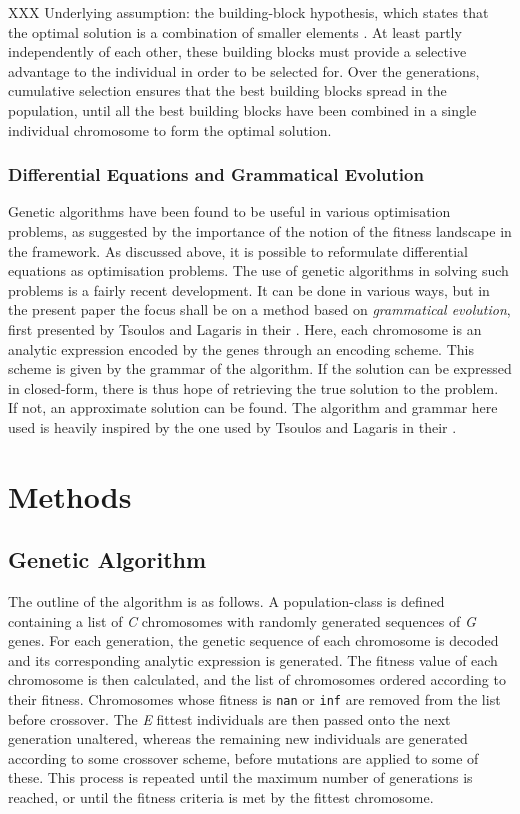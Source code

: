 \documentclass[multicolumn, 12pt]{extarticle}
\begin{document}
XXX
Underlying assumption: the building-block hypothesis, which states that the optimal solution is a combination of smaller elements \cite{Eyal}. At least partly independently of each other, these building blocks must provide a selective advantage to the individual in order to be selected for. Over the generations, cumulative selection ensures that the best building blocks spread in the population, until all the best building blocks have been combined in a single individual chromosome to form the optimal solution. 

\subsubsection{Differential Equations and Grammatical Evolution}
Genetic algorithms have been found to be useful in various optimisation problems, as suggested by the importance of the notion of the fitness landscape in the framework. As discussed above, it is possible to reformulate differential equations as optimisation problems. The use of genetic algorithms in solving such problems is a fairly recent development. It can be done in various ways, but in the present paper the focus shall be on a method based on \textit{grammatical evolution}, first presented by Tsoulos and Lagaris in their  \cite{Lagaris}. Here, each chromosome is an analytic expression encoded by the genes through an encoding scheme. This scheme is given by the grammar of the algorithm. If the solution can be expressed in closed-form, there is thus hope of retrieving the true solution to the problem. If not, an approximate solution can be found. The algorithm and grammar here used is heavily inspired by the one used by Tsoulos and Lagaris in their  \cite{Lagaris}.



\section{Methods}

\subsection{Genetic Algorithm}
The outline of the algorithm is as follows. A population-class is defined containing a list of \textit{C} chromosomes with randomly generated sequences of \textit{G} genes. For each generation, the genetic sequence of each chromosome is decoded and its corresponding analytic expression is generated. The fitness value of each chromosome is then calculated, and the list of chromosomes ordered according to their fitness. Chromosomes whose fitness is \texttt{nan} or \texttt{inf} are removed from the list before crossover. The \textit{E} fittest individuals are then passed onto the next generation unaltered, whereas the remaining new individuals are generated according to some crossover scheme, before mutations are applied to some of these.  This process is repeated until the maximum number of generations is reached, or until the fitness criteria is met by the fittest chromosome.
\end{document}
